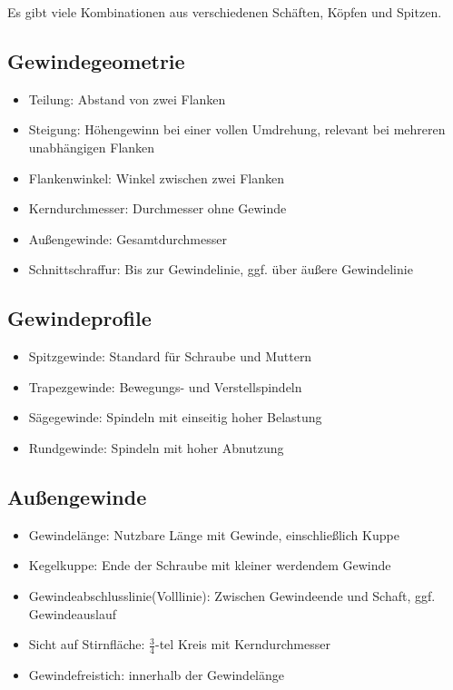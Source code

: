 \documentclass[a4paper,DIV=15,fontsize=11pt]{scrartcl}
\begin{document}
Es gibt viele Kombinationen aus verschiedenen Schäften, Köpfen und Spitzen.
	
\subsection{Gewindegeometrie}
\begin{itemize}
	\item Teilung: Abstand von zwei Flanken
	\item Steigung: Höhengewinn bei einer vollen Umdrehung, relevant bei mehreren unabhängigen Flanken
	\item Flankenwinkel: Winkel zwischen zwei Flanken
	\item Kerndurchmesser: Durchmesser ohne Gewinde
	\item Außengewinde: Gesamtdurchmesser
	\item Schnittschraffur: Bis zur Gewindelinie, ggf. über äußere Gewindelinie
\end{itemize}
	
\subsection{Gewindeprofile}
\begin{itemize}
	\item Spitzgewinde: Standard für Schraube und Muttern
	\item Trapezgewinde: Bewegungs- und Verstellspindeln
	\item Sägegewinde: Spindeln mit einseitig hoher Belastung
	\item Rundgewinde: Spindeln mit hoher Abnutzung
\end{itemize}
	
\subsection{Außengewinde}
\begin{itemize}
	\item Gewindelänge: Nutzbare Länge mit Gewinde, einschließlich Kuppe
	\item Kegelkuppe: Ende der Schraube mit kleiner werdendem Gewinde
	\item Gewindeabschlusslinie(Volllinie): Zwischen Gewindeende und Schaft, ggf. Gewindeauslauf
	\item Sicht auf Stirnfläche: $\frac{3}{4}$-tel Kreis mit Kerndurchmesser
	\item Gewindefreistich: innerhalb der Gewindelänge
\end{itemize}
	
\end{document}

